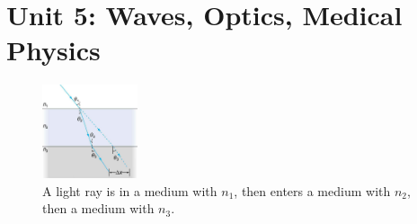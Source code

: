 \documentclass[12pt,twocolumn]{article}
\begin{document}
\clearpage

\section{Unit 5: Waves, Optics, Medical Physics}

\begin{figure}[ht]
\centering
\includegraphics[width=0.25\textwidth]{lens_1.jpeg}
\caption{\label{fig:lens_1} \small A light ray is in a medium with $n_1$, then enters a medium with $n_2$, then a medium with $n_3$.}
\end{figure}
\end{document}
